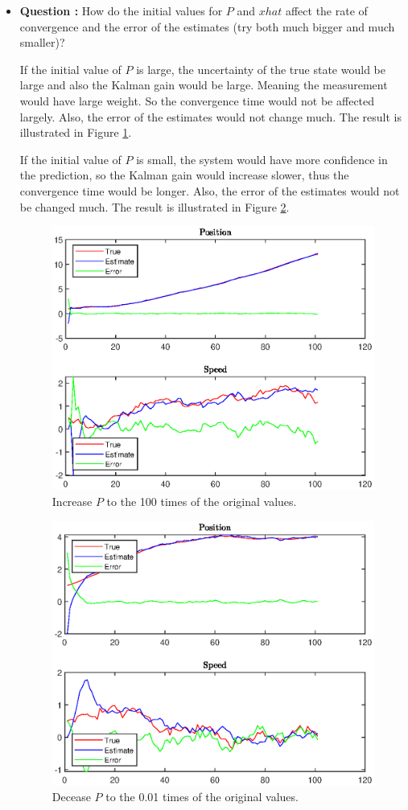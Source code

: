 \documentclass[11pt,a4paper]{article}
\begin{document}
\begin{itemize}
	\item \addtocounter{cnt_questions}{1} \textbf{Question :} How do the initial values for $P$ and $xhat$ affect the rate of convergence and the error of the estimates (try both much bigger and much smaller)?
		\par If the initial value of $P$ is large, the uncertainty of the true state would be large and also the Kalman gain would be large. Meaning the measurement would have large weight. So the convergence time would not be affected largely. Also, the error of the estimates would not change much. The result is illustrated in Figure \ref{fig:Warmup_P_big}.
		\par If the initial value of $P$ is small, the system would have more confidence in the prediction, so the Kalman gain would increase slower, thus the convergence time would be longer. Also, the error of the estimates would not be changed much. The result is illustrated in Figure \ref{fig:Warmup_P_small}.
		\begin{figure}[H]
			\centering
			\includegraphics[width=0.71\columnwidth]{Figure/Warmup_P_big.eps}
			\caption{Increase $P$ to the 100 times of the original values.}
			\label{fig:Warmup_P_big}
		\end{figure}

		\begin{figure}[H]
			\centering
			\includegraphics[width=0.71\columnwidth]{Figure/Warmup_P_small.eps}
			\caption{Decease $P$ to the 0.01 times of the original values.}
			\label{fig:Warmup_P_small}
		\end{figure}


\end{itemize}
\end{document}
